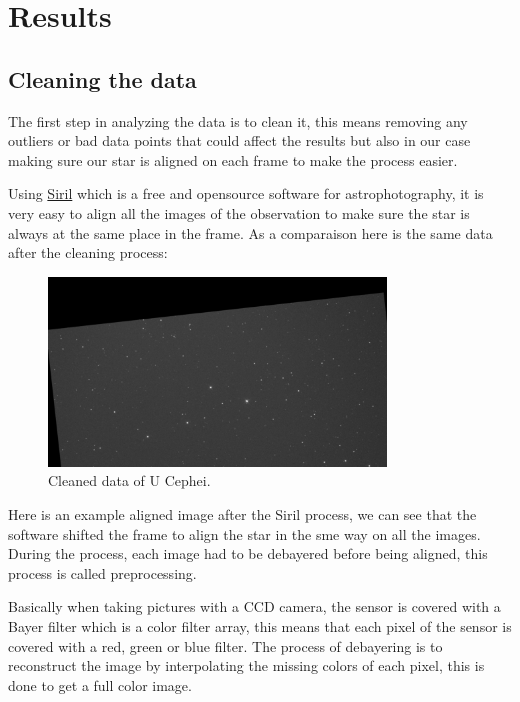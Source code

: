 \documentclass[12pt,a4paper]{article}
\begin{document}
\section{Results}

\subsection{Cleaning the data}

The first step in analyzing the data is to clean it, this means removing any outliers or bad data points that could affect the results but also in our case making sure our star is aligned on each frame to make the process easier.

\bigskip


Using \href{https://siril.org/fr/}{Siril} which is a free and opensource software for astrophotography, it is very easy to align all the images of the observation to make sure the star is always at the same place in the frame.
As a comparaison here is the same data after the cleaning process:

\begin{figure}[H]
    \centering
    \includegraphics[width=0.8\textwidth]{imgs/aligned.png}
    \caption{Cleaned data of U Cephei.}
    \label{fig:cleaned_data}
\end{figure}

Here is an example aligned image after the Siril process, we can see that the software shifted
the frame to align the star in the sme way on all the images. During the process,
each image had to be debayered before being aligned, this process is called preprocessing.

\bigskip

Basically when taking pictures with a CCD camera, the sensor is covered with a Bayer filter which is a color filter array, this means that each pixel of the sensor is covered with a red, green or blue filter.
The process of debayering is to reconstruct the image by interpolating the missing colors of each pixel, this is done to get a full color image.
\end{document}
